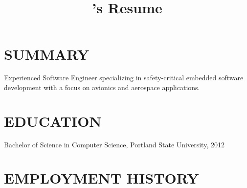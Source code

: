 \documentclass{article}
\title{\name's Resume}
\begin{document}
\section*{SUMMARY}
        Experienced Software Engineer specializing in safety-critical embedded software development with a focus on avionics and aerospace applications.

\section*{EDUCATION}
        Bachelor of Science in Computer Science, Portland State University, 2012

\section*{EMPLOYMENT HISTORY}
\end{document}
